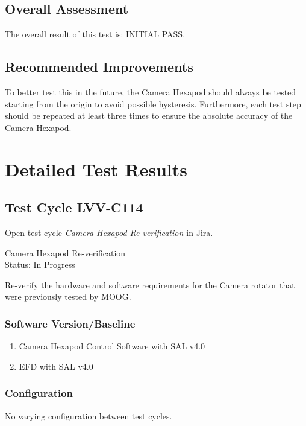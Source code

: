 \documentclass[SE,lsstdraft,STR,toc]{lsstdoc}
\providecommand{\tightlist}{
  \setlength{\itemsep}{0pt}\setlength{\parskip}{0pt}}
\begin{document}
\subsection{Overall Assessment}
\label{sect:overallassessment}

The overall result of this test is: INITIAL PASS.\\[2\baselineskip]


\subsection{Recommended Improvements}
\label{sect:recommendations}

To better test this in the future, the Camera Hexapod should always be
tested starting from the origin to avoid possible hysteresis.
Furthermore, each test step should be repeated at least three times to
ensure the absolute accuracy of the Camera Hexapod.~


\newpage
\section{Detailed Test Results}
\label{sect:detailedtestresults}

\subsection{Test Cycle LVV-C114 }

Open test cycle {\it \href{https://jira.lsstcorp.org/secure/Tests.jspa#/testrun/LVV-C114}{Camera Hexapod Re-verification
}} in Jira.

Camera Hexapod Re-verification
\\
Status: In Progress

Re-verify the hardware and software requirements for the Camera rotator
that were previously tested by MOOG.


\subsubsection{Software Version/Baseline}
\begin{enumerate}
\tightlist
\item
  Camera Hexapod Control Software with SAL v4.0
\item
  EFD with SAL v4.0
\end{enumerate}


\subsubsection{Configuration}
No varying configuration between test cycles.
\end{document}
